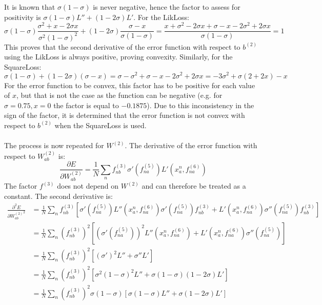 \documentclass[fleqn]{article}
\begin{document}
It is known that $\sigma (1-\sigma)$ is never negative, hence the factor to assess for positivity is $\sigma(1-\sigma)L'' + (1-2\sigma)L'$. For the LikLoss:
\begin{equation}
    \sigma(1-\sigma)\frac{\sigma^2 + x -2\sigma x}{\sigma^2 (1-\sigma)^2} + (1-2\sigma)\frac{\sigma -x}{\sigma(1-\sigma)} = \frac{x + \sigma^2 -2\sigma x + \sigma -x -2\sigma^2 +2\sigma x}{\sigma(1-\sigma)} = 1
\end{equation}
This proves that the second derivative of the error function with respect to $b^{(2)}$ using the LikLoss is always positive, proving convexity. Similarly, for the SquareLoss:
\begin{equation}
        \sigma(1-\sigma) +(1-2\sigma)(\sigma-x) = \sigma - \sigma^2 + \sigma - x - 2\sigma^2 + 2\sigma x = -3\sigma^2 + \sigma(2+2x) - x
\end{equation}
For the error function to be convex, this factor has to be positive for each value of $x$, but that is not the case as the function can be negative (e.g. for $\sigma=0.75, x = 0$ the factor is equal to $-0.1875$). Due to this inconsistency in the sign of the factor, it is determined that the error function is not convex with respect to $b^{(2)}$ when the SquareLoss is used.\\ \ \\
The process is now repeated for $W^{(2)}$. The derivative of the error function with respect to $W^{(2)}_{ab}$ is:
\begin{equation}
    \frac{\partial E}{\partial W^{(2)}_{ab}} = \frac{1}{N} \sum_n f^{(3)}_{nb} \sigma'\left(f^{(5)}_{na}\right) L'\left(x^n_a, f^{(6)}_{na}\right)
\end{equation}
The factor $f^{(3)}$ does not depend on $W^{(2)}$ and can therefore be treated as a constant. The second derivative is:
\begin{equation}
    \begin{split}
        \frac{\partial ^2 E}{\partial {W^{(2)}_{ab}}^2} & = \frac{1}{N} \sum_n f^{(3)}_{nb} \left [
        \sigma'\left(f^{(5)}_{na}\right) L''\left(x^n_a, f^{(6)}_{na}\right) \sigma'\left(f^{(5)}_{na}\right) f^{(3)}_{nb} + L'\left(x^n_a, f^{(6)}_{na}\right) \sigma''\left(f^{(5)}_{na}\right) f^{(3)}_{nb}
        \right] \\
        & = \frac{1}{N} \sum_n \left(f^{(3)}_{nb}\right)^2 \left [
        \left(\sigma'\left(f^{(5)}_{na}\right)\right)^2 L''\left(x^n_a, f^{(6)}_{na}\right) + L'\left(x^n_a, f^{(6)}_{na}\right) \sigma''\left(f^{(5)}_{na}\right)
        \right] \\
        & = \frac{1}{N} \sum_n \left(f^{(3)}_{nb}\right)^2 \left[
        (\sigma ')^2 L'' + \sigma'' L' \right] \\
        & = \frac{1}{N} \sum_n \left(f^{(3)}_{nb}\right)^2 \left[
        \sigma^2 (1-\sigma)^2 L'' + \sigma (1-\sigma)(1-2 \sigma) L' \right] \\
        & = \frac{1}{N} \sum_n \left(f^{(3)}_{nb}\right)^2 \sigma (1-\sigma) \left[
        \sigma (1-\sigma) L'' + \sigma (1-2 \sigma) L' \right]
    \end{split}
\end{equation}
\end{document}
